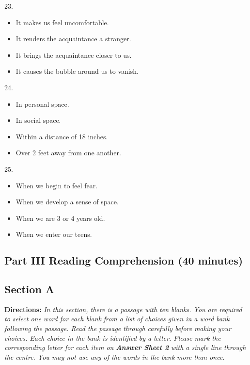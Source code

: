 \documentclass[UTF8,11pt]{ctexart}
\begin{document}
23.


\begin{itemize}[leftmargin=2em,itemsep=.2em,topsep=.4em]\item[A.] It makes us feel uncomfortable.
\item[B.] It renders the acquaintance a stranger.
\item[C.] It brings the acquaintance closer to us.
\item[D.] It causes the bubble around us to vanish.
\end{itemize}

24.


\begin{itemize}[leftmargin=2em,itemsep=.2em,topsep=.4em]\item[A.] In personal space.
\item[B.] In social space.
\item[C.] Within a distance of 18 inches.
\item[D.] Over 2 feet away from one another.
\end{itemize}

25.


\begin{itemize}[leftmargin=2em,itemsep=.2em,topsep=.4em]\item[A.] When we begin to feel fear.
\item[B.] When we develop a sense of space.
\item[C.] When we are 3 or 4 years old.
\item[D.] When we enter our teens.
\end{itemize}

\subsection*{\textbf{Part III Reading Comprehension (40 minutes)}}


\subsection*{\textbf{Section A}}


\textbf{Directions:} \textit{In this section, there is a passage with ten blanks. You are required to select one word for each blank} \textit{from a list of choices given in a word bank following the passage. Read the passage through carefully before} \textit{making your choices. Each choice in the bank is identified by a letter. Please mark the corresponding letter for} \textit{each item on }\textbf{\textit{Answer Sheet 2}}\textit{ with a single line through the centre. You may not use any of the words in the bank} \textit{more than once.}
\end{document}
